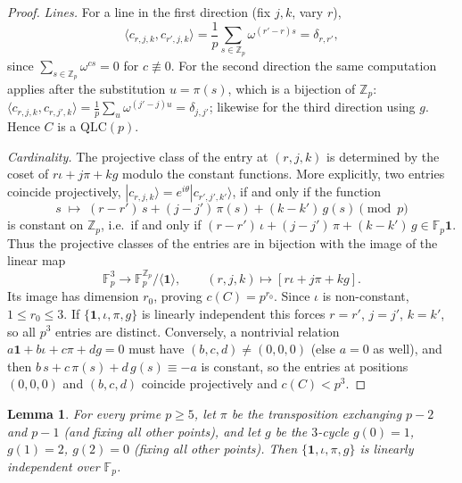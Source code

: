\documentclass[11pt]{amsart}
\newtheorem{lemma}[theorem]{Lemma}
\theoremstyle{definition}
\newcommand{\Z}{\mathbb{Z}}
\newcommand{\F}{\mathbb{F}}
\newcommand{\ket}[1]{|#1\rangle}
\newcommand{\ip}[2]{\langle #1,#2\rangle}
\newcommand{\QLC}{\mathrm{QLC}}
\begin{document}
\begin{proof}
\emph{Lines.}  For a line in the first direction (fix $j,k$, vary $r$),
\[
\ip{c_{r,j,k}}{c_{r',j,k}}
=\frac1p\sum_{s\in\Z_p}\omega^{(r'-r)s}
=\delta_{r,r'} ,
\]
since $\sum_{s\in\Z_p}\omega^{cs}=0$ for $c\not\equiv0$.  For the second
direction the same computation applies after the substitution
$u=\pi(s)$, which is a bijection of $\Z_p$:
$\ip{c_{r,j,k}}{c_{r,j',k}}=\frac1p\sum_u\omega^{(j'-j)u}=\delta_{j,j'}$;
likewise for the third direction using $g$.  Hence $C$ is a $\QLC(p)$.

\emph{Cardinality.}  The projective class of the entry at $(r,j,k)$ is
determined by the coset of
$r\iota+j\pi+kg$ modulo the constant functions.  More explicitly, two
entries coincide projectively,
$\ket{c_{r,j,k}}=e^{i\theta}\ket{c_{r',j',k'}}$, if and only if the
function
\[
s\;\longmapsto\;(r-r')\,s+(j-j')\,\pi(s)+(k-k')\,g(s)\pmod p
\]
is constant on $\Z_p$, i.e.\ if and only if
$(r-r')\,\iota+(j-j')\,\pi+(k-k')\,g\in\F_p\mathbf1$.
Thus the projective classes of the entries are in bijection with the image
of the linear map
\[
\F_p^3\longrightarrow \F_p^{\Z_p}/\langle\mathbf1\rangle,\qquad
(r,j,k)\longmapsto[r\iota+j\pi+kg].
\]
Its image has dimension $r_0$, proving $c(C)=p^{r_0}$.  Since $\iota$ is
non-constant, $1\le r_0\le3$.  If
$\{\mathbf1,\iota,\pi,g\}$ is linearly independent this forces
$r=r'$, $j=j'$, $k=k'$, so all $p^3$ entries are distinct.  Conversely, a
nontrivial relation $a\mathbf1+b\iota+c\pi+dg=0$ must have
$(b,c,d)\ne(0,0,0)$ (else $a=0$ as well), and then
$b\,s+c\,\pi(s)+d\,g(s)\equiv-a$ is constant, so the entries at positions
$(0,0,0)$ and $(b,c,d)$ coincide projectively and $c(C)<p^3$.
\end{proof}

\begin{lemma}\label{lem:pair}
For every prime $p\ge5$, let $\pi$ be the transposition exchanging $p-2$
and $p-1$ (and fixing all other points), and let $g$ be the $3$-cycle
$g(0)=1$, $g(1)=2$, $g(2)=0$ (fixing all other points).  Then
$\{\mathbf1,\iota,\pi,g\}$ is linearly independent over $\F_p$.
\end{lemma}
\end{document}
